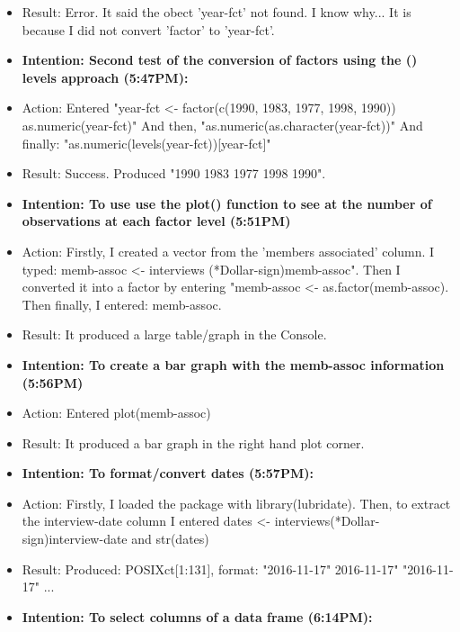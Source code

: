 \documentclass[a4paper,12pt]{article}
\begin{document}
\begin{itemize}
\item Result: Error. It said the obect 'year-fct' not found. I know why... It is because I did not convert 'factor' to 'year-fct'.


\item \textbf{Intention: Second test of the conversion of factors using the () levels approach (5:47PM):}


\item Action: Entered "year-fct <- factor(c(1990, 1983, 1977, 1998, 1990)) as.numeric(year-fct)" And then, "as.numeric(as.character(year-fct))" And finally: "as.numeric(levels(year-fct))[year-fct]"


\item Result: Success. Produced "1990 1983 1977 1998 1990".


\item \textbf{Intention: To use use the plot() function to see at the number of observations at each factor level (5:51PM)}


\item Action: Firstly, I created a vector from the 'members associated' column. I typed: memb-assoc <- interviews (*Dollar-sign)memb-assoc". Then I converted it into a factor by entering "memb-assoc <- as.factor(memb-assoc). Then finally, I entered: memb-assoc. 


\item Result: It produced a large table/graph in the Console. 


\item \textbf{Intention: To create a bar graph with the memb-assoc information (5:56PM)}


\item Action: Entered plot(memb-assoc)


\item Result: It produced a bar graph in the right hand plot corner. 


\item \textbf{Intention: To format/convert dates (5:57PM):}


\item Action: Firstly, I loaded the package with library(lubridate). Then, to extract the interview-date column I entered dates <- interviews(*Dollar-sign)interview-date and 
str(dates)

\item Result: Produced: POSIXct[1:131], format: "2016-11-17" 2016-11-17" "2016-11-17" ... 


\item \textbf{Intention: To select columns of a data frame (6:14PM):}



\end{itemize}
\end{document}
